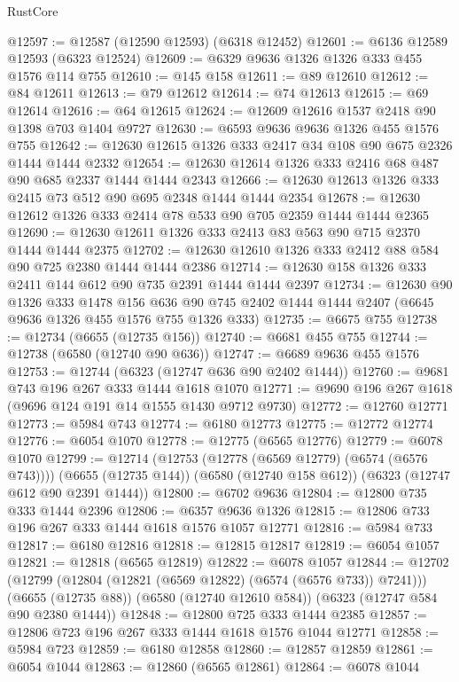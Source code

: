 \begin{lexlean}{RustCore}
\begin{coremodule}
@12597 := @12587 (@12590 @12593) (@6318 @12452)
@12601 := @6136 @12589 @12593 (@6323 @12524)
@12609 := @6329 @9636 @1326 @1326 @333 @455 @1576 @114 @755
@12610 := @145 @158
@12611 := @89 @12610
@12612 := @84 @12611
@12613 := @79 @12612
@12614 := @74 @12613
@12615 := @69 @12614
@12616 := @64 @12615
@12624 := @12609 @12616 @1537 @2418 @90 @1398 @703 @1404 @9727
@12630 := @6593 @9636 @9636 @1326 @455 @1576 @755
@12642 := @12630 @12615 @1326 @333 @2417 @34 @108 @90 @675 @2326 @1444 @1444 @2332
@12654 := @12630 @12614 @1326 @333 @2416 @68 @487 @90 @685 @2337 @1444 @1444 @2343
@12666 := @12630 @12613 @1326 @333 @2415 @73 @512 @90 @695 @2348 @1444 @1444 @2354
@12678 := @12630 @12612 @1326 @333 @2414 @78 @533 @90 @705 @2359 @1444 @1444 @2365
@12690 := @12630 @12611 @1326 @333 @2413 @83 @563 @90 @715 @2370 @1444 @1444 @2375
@12702 := @12630 @12610 @1326 @333 @2412 @88 @584 @90 @725 @2380 @1444 @1444 @2386
@12714 := @12630 @158 @1326 @333 @2411 @144 @612 @90 @735 @2391 @1444 @1444 @2397
@12734 := @12630
    @90
    @1326
    @333
    @1478
    @156
    @636
    @90
    @745
    @2402
    @1444
    @1444
    @2407
    (@6645 @9636 @1326 @455 @1576 @755 @1326 @333)
@12735 := @6675 @755
@12738 := @12734 (@6655 (@12735 @156))
@12740 := @6681 @455 @755
@12744 := @12738 (@6580 (@12740 @90 @636))
@12747 := @6689 @9636 @455 @1576
@12753 := @12744 (@6323 (@12747 @636 @90 @2402 @1444))
@12760 := @9681 @743 @196 @267 @333 @1444 @1618 @1070
@12771 := @9690 @196 @267 @1618 (@9696 @124 @191 @14 @1555 @1430 @9712 @9730)
@12772 := @12760 @12771
@12773 := @5984 @743
@12774 := @6180 @12773
@12775 := @12772 @12774
@12776 := @6054 @1070
@12778 := @12775 (@6565 @12776)
@12779 := @6078 @1070
@12799 := @12714
    (@12753 (@12778 (@6569 @12779) (@6574 (@6576 @743))))
    (@6655 (@12735 @144))
    (@6580 (@12740 @158 @612))
    (@6323 (@12747 @612 @90 @2391 @1444))
@12800 := @6702 @9636
@12804 := @12800 @735 @333 @1444 @2396
@12806 := @6357 @9636 @1326
@12815 := @12806 @733 @196 @267 @333 @1444 @1618 @1576 @1057 @12771
@12816 := @5984 @733
@12817 := @6180 @12816
@12818 := @12815 @12817
@12819 := @6054 @1057
@12821 := @12818 (@6565 @12819)
@12822 := @6078 @1057
@12844 := @12702
    (@12799 (@12804 (@12821 (@6569 @12822) (@6574 (@6576 @733)) @7241)))
    (@6655 (@12735 @88))
    (@6580 (@12740 @12610 @584))
    (@6323 (@12747 @584 @90 @2380 @1444))
@12848 := @12800 @725 @333 @1444 @2385
@12857 := @12806 @723 @196 @267 @333 @1444 @1618 @1576 @1044 @12771
@12858 := @5984 @723
@12859 := @6180 @12858
@12860 := @12857 @12859
@12861 := @6054 @1044
@12863 := @12860 (@6565 @12861)
@12864 := @6078 @1044

\end{coremodule}
\end{lexlean}
